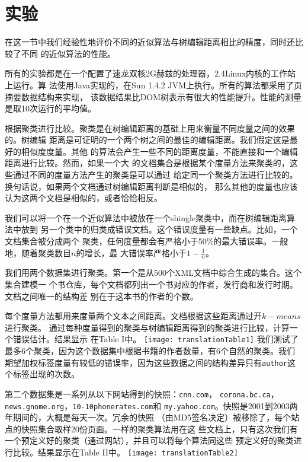 \section{实验}
在这一节中我们经验性地评价不同的近似算法与树编辑距离相比的精度，同时还比较了不同
的近似算法的性能。

所有的实验都是在一个配置了速龙双核2G赫兹的处理器，2.4Linux内核的工作站上运行。算
法使用Java实现的，在Sun 1.4.2 JVM上执行。所有的算法都采用了页摘要数据结构来实现，
该数据结果比DOM树表示有很大的性能提升。性能的测量是取10次运行的平均值。

根据聚类进行比较。聚类是在树编辑距离的基础上用来衡量不同度量之间的效果的。树编辑
距离是可证明的一个两个树之间的最佳的编辑距离。我们假定这是最好的相似度度量。其他
的算法会产生一些不同的距离度量，不能直接和一个编辑距离进行比较。然而，如果一个大
的文档集合是根据某个度量方法来聚类的，这些通过不同的度量方法产生的聚类是可以通过
给定同一个聚类方法进行比较的。换句话说，如果两个文档通过树编辑距离判断是相似的，
那么其他的度量也应该认为这两个文档是相似的，或者恰恰相反。

我们可以将一个在一个近似算法中被放在一个shingle聚类中，而在树编辑距离算法中放到
另一个类中的归类成错误文档。这个错误度量有一些缺点。比如，一个文档集合被分成两个
聚类，任何度量都会有严格小于50\%的最大错误率。一般地，随着聚类数目$n$的增长，最
大错误率严格小于$1-\frac{1}{n}$。

我们用两个数据集进行聚类。第一个是从500个XML文档中综合生成的集合。这个集合建模一
个书仓库，每个文档都列出一个书对应的作者，发行商和发行时期。文档之间唯一的结构差
别在于这本书的作者的个数。

每个度量方法都用来度量两个文本之间距离。文档根据这些距离通过开$k-means$进行聚类。
通过每种度量得到的聚类与树编辑距离得到的聚类进行比较，计算一个错误估计。结果显示
在Table I中。
{\centering
  \texttt{[image: translationTable1]}
}
我们测试了最多6个聚类，因为这个数据集中根据书籍的作者数量，有6个自然的聚类。我们
期望加权标签度量有较低的错误率，因为这些数据之间的结构差异只有\texttt{author}这
个标签出现的次数。

第二个数据集是一系列从以下网站得到的快照：\texttt{cnn.com}，
\texttt{corona.bc.ca}，\texttt{news.gnome.org}，\texttt{10-10phonerates.com}和
\texttt{my.yahoo.com}。快照是2001到2003两年期间的，大概是每天一次。冗余的快照
（由MD5签名决定）被移除了，每个站点的快照集合取样20份页面。一样的聚类算法用在这
些文档上，只有这次我们有一个预定义好的聚类（通过网站），并且可以将每个算法同这些
预定义好的聚类进行比较。结果显示在Table II中。
{\centering
\texttt{[image: translationTable2]}
}

